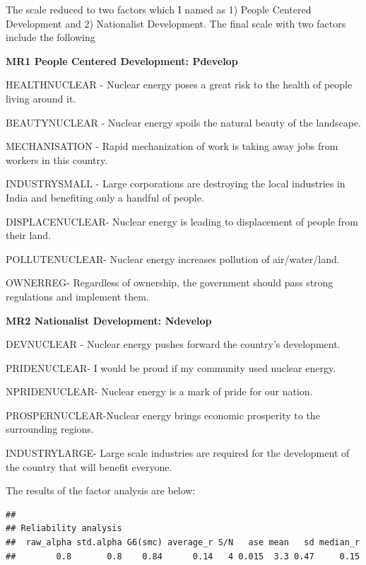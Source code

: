 \documentclass[
]{article}
\begin{document}
The scale reduced to two factors which I named as 1) People Centered
Development and 2) Nationalist Development. The final scale with two
factors include the following

\textbf{MR1 People Centered Development: Pdevelop}

HEALTHNUCLEAR - Nuclear energy poses a great risk to the health of
people living around it.

BEAUTYNUCLEAR - Nuclear energy spoils the natural beauty of the
landscape.

MECHANISATION - Rapid mechanization of work is taking away jobs from
workers in this country.

INDUSTRYSMALL - Large corporations are destroying the local industries
in India and benefiting only a handful of people.

DISPLACENUCLEAR- Nuclear energy is leading to displacement of people
from their land.

POLLUTENUCLEAR- Nuclear energy increases pollution of air/water/land.

OWNERREG- Regardless of ownership, the government should pass strong
regulations and implement them.

\textbf{MR2 Nationalist Development: Ndevelop}

DEVNUCLEAR - Nuclear energy pushes forward the country's development.

PRIDENUCLEAR- I would be proud if my community used nuclear energy.

NPRIDENUCLEAR- Nuclear energy is a mark of pride for our nation.

PROSPERNUCLEAR-Nuclear energy brings economic prosperity to the
surrounding regions.

INDUSTRYLARGE- Large scale industries are required for the development
of the country that will benefit everyone.

The results of the factor analysis are below:

\begin{verbatim}
## 
## Reliability analysis   
##  raw_alpha std.alpha G6(smc) average_r S/N   ase mean   sd median_r
##        0.8       0.8    0.84      0.14   4 0.015  3.3 0.47     0.15
\end{verbatim}
\end{document}
